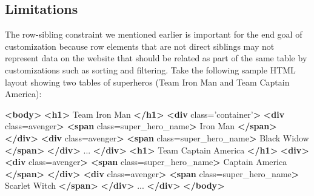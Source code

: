 \documentclass[sigconf,10pt]{acmart}
\newenvironment{Shaded}{}{}
\newcommand{\KeywordTok}[1]{\textcolor[rgb]{0.00,0.44,0.13}{\textbf{#1}}}
\newcommand{\NormalTok}[1]{#1}
\newcommand{\OtherTok}[1]{\textcolor[rgb]{0.00,0.44,0.13}{#1}}
\newcommand{\StringTok}[1]{\textcolor[rgb]{0.25,0.44,0.63}{#1}}
\begin{document}
\hypertarget{limitations}{%
\subsection{Limitations}\label{limitations}}

The row-sibling constraint we mentioned earlier is important for the end
goal of customization because row elements that are not direct siblings
may not represent data on the website that should be related as part of
the same table by customizations such as sorting and filtering. Take the
following sample HTML layout showing two tables of superheros (Team Iron
Man and Team Captain America):

\begin{Shaded}
\begin{Highlighting}[]
\KeywordTok{\textless{}body\textgreater{}}
  \KeywordTok{\textless{}h1\textgreater{}}\NormalTok{ Team Iron Man }\KeywordTok{\textless{}/h1\textgreater{}}
  \KeywordTok{\textless{}div}\OtherTok{ class=}\StringTok{’container’}\KeywordTok{\textgreater{}}
      \KeywordTok{\textless{}div}\OtherTok{ class=}\StringTok{\textquotesingle{}avenger\textquotesingle{}}\KeywordTok{\textgreater{}}
          \KeywordTok{\textless{}span}\OtherTok{ class=}\StringTok{\textquotesingle{}super\_hero\_name\textquotesingle{}}\KeywordTok{\textgreater{}}\NormalTok{ Iron Man }\KeywordTok{\textless{}/span\textgreater{}}
      \KeywordTok{\textless{}/div\textgreater{}}
      \KeywordTok{\textless{}div}\OtherTok{ class=}\StringTok{\textquotesingle{}avenger\textquotesingle{}}\KeywordTok{\textgreater{}}
          \KeywordTok{\textless{}span}\OtherTok{ class=}\StringTok{\textquotesingle{}super\_hero\_name\textquotesingle{}}\KeywordTok{\textgreater{}}\NormalTok{  Black Widow }\KeywordTok{\textless{}/span\textgreater{}}
      \KeywordTok{\textless{}/div\textgreater{}}
\NormalTok{      ...}
  \KeywordTok{\textless{}/div\textgreater{}}
  \KeywordTok{\textless{}h1\textgreater{}}\NormalTok{ Team Captain America }\KeywordTok{\textless{}/h1\textgreater{}}
  \KeywordTok{\textless{}div\textgreater{}}
      \KeywordTok{\textless{}div}\OtherTok{ class=}\StringTok{\textquotesingle{}avenger\textquotesingle{}}\KeywordTok{\textgreater{}}
          \KeywordTok{\textless{}span}\OtherTok{ class=}\StringTok{\textquotesingle{}super\_hero\_name\textquotesingle{}}\KeywordTok{\textgreater{}}\NormalTok{ Captain America }\KeywordTok{\textless{}/span\textgreater{}}
      \KeywordTok{\textless{}/div\textgreater{}}
      \KeywordTok{\textless{}div}\OtherTok{ class=}\StringTok{\textquotesingle{}avenger\textquotesingle{}}\KeywordTok{\textgreater{}}
          \KeywordTok{\textless{}span}\OtherTok{ class=}\StringTok{\textquotesingle{}super\_hero\_name\textquotesingle{}}\KeywordTok{\textgreater{}}\NormalTok{  Scarlet Witch }\KeywordTok{\textless{}/span\textgreater{}}
      \KeywordTok{\textless{}/div\textgreater{}}
\NormalTok{      ...}
  \KeywordTok{\textless{}/div\textgreater{}}
\KeywordTok{\textless{}/body\textgreater{}}
\end{Highlighting}
\end{Shaded}
\end{document}
